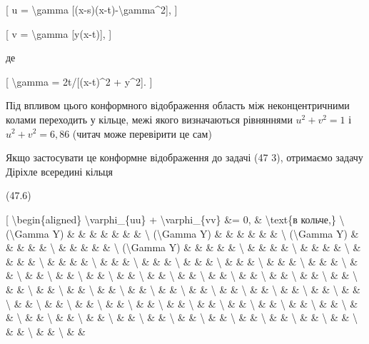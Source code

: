 \documentclass[
]{article}
\begin{document}
{{[} u = \textbackslash gamma {[}(x-s)(x-t)-\textbackslash gamma\^{}2{]},
{]}

{[} v = \textbackslash gamma {[}y(x-t){]}, {]}

де

{[} \textbackslash gamma = 2t/{[}(x-t)\^{}2 + y\^{}2{]}. {]}

Під впливом цього конформного відображення область між неконцентричними
колами переходить у кільце, межі якого визначаються рівняннями
\(u^2 + v^2 = 1\) і \(u^2 + v^2 = 6,86\) (читач може перевірити це сам)

Якщо застосувати це конформне відображення до задачі (47 3), отримаємо
задачу Діріхле всередині кільця

(47.6)

{[} \textbackslash begin\{aligned\} \textbackslash varphi\_\{uu\} +
\textbackslash varphi\_\{vv\} \&= 0, \& \textbackslash text\{в кольче,\}
\textbackslash{} (\textbackslash Gamma Y) \& \& \& \& \& \& \&
\textbackslash{} (\textbackslash Gamma Y) \& \& \& \& \& \&
\textbackslash{} (\textbackslash Gamma Y) \& \& \& \& \&
\textbackslash{} \& \& \& \& \& \textbackslash{} (\textbackslash Gamma
Y) \& \& \& \& \& \textbackslash{} \& \& \& \& \textbackslash{} \& \& \&
\& \textbackslash{} \& \& \& \& \textbackslash{} \& \& \& \&
\textbackslash{} \& \& \& \textbackslash{} \& \& \& \textbackslash{} \&
\& \& \textbackslash{} \& \& \& \textbackslash{} \& \& \&
\textbackslash{} \& \& \& \textbackslash{} \& \& \textbackslash{} \& \&
\textbackslash{} \& \& \textbackslash{} \& \& \textbackslash{} \& \&
\textbackslash{} \& \& \textbackslash{} \& \& \textbackslash{} \& \&
\textbackslash{} \& \& \textbackslash{} \& \& \textbackslash{} \& \&
\textbackslash{} \& \& \textbackslash{} \& \& \textbackslash{} \& \&
\textbackslash{} \& \& \textbackslash{} \& \& \textbackslash{} \& \&
\textbackslash{} \& \& \textbackslash{} \& \& \textbackslash{} \& \&
\textbackslash{} \& \& \textbackslash{} \& \& \textbackslash{} \& \&
\textbackslash{} \& \& \textbackslash{} \& \& \textbackslash{} \& \&
\textbackslash{} \& \& \textbackslash{} \& \& \textbackslash{} \& \&
\textbackslash{} \& \& \textbackslash{} \& \& \textbackslash{} \& \&
\textbackslash{} \& \& \textbackslash{} \& \& \textbackslash{} \& \&
\textbackslash{} \& \& \textbackslash{} \& \& \textbackslash{} \& \&
\textbackslash{} \& \& \textbackslash{} \& \& \textbackslash{} \& \&
\textbackslash{} \& \& \textbackslash{} \& \& \textbackslash{} \& \&
\textbackslash{} \& \& \textbackslash{} \& \& \textbackslash{} \& \&
\textbackslash{} \& \& \textbackslash{} \& \& \textbackslash{} \& \&
}
\end{document}
